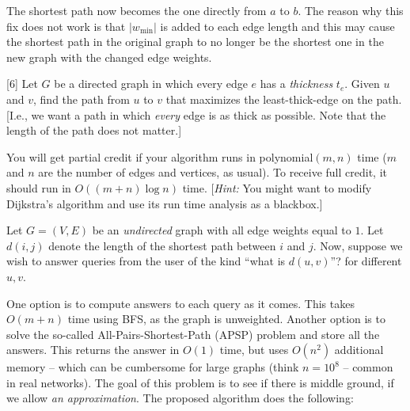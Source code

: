\documentclass[addpoints]{exam}
\begin{document}
\begin{questions}
\begin{center}
\end{center}

The shortest path now becomes the one directly from $a$ to $b$. The reason why this fix does not work is that $|w_{\min}|$ is added to each edge length and this may cause the shortest path in the original graph to no longer be the shortest one in the new graph with the changed edge weights.

[6]
Let $G$ be a directed graph in which every edge $e$ has a {\em thickness} $t_{e}$.  Given $u$ and $v$, find the path from $u$ to $v$ that maximizes the least-thick-edge on the path. [I.e., we want a path in which {\em every} edge is as thick as possible. Note that the length of the path does not matter.]

You will get partial credit if your algorithm runs in polynomial$(m, n)$ time ($m$ and $n$ are the number of edges and vertices, as usual). To receive full credit, it should run in $O((m+n)\log n)$ time. [{\em Hint: } You might want to modify Dijkstra's algorithm and use its run time analysis as a blackbox.]

Let $G = (V, E)$ be an {\em undirected} graph with all edge weights equal to $1$. Let $d(i,j)$ denote the length of the shortest path between $i$ and $j$.  Now, suppose we wish to answer queries from the user of the kind ``what is $d(u, v)$''? for different $u, v$.

One option is to compute answers to each query as it comes. This takes $O(m+n)$ time using BFS, as the graph is unweighted.  Another option is to solve the so-called All-Pairs-Shortest-Path (APSP) problem and store all the answers. This returns the answer in $O(1)$ time, but uses $O(n^2)$ additional memory -- which can be cumbersome for large graphs (think $n = 10^8$ -- common in real networks).  The goal of this problem is to see if there is middle ground, if we allow {\em an approximation}. The proposed algorithm does the following:


\end{questions}
\end{document}
